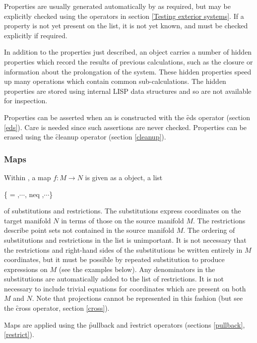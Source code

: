 Properties are usually generated automatically by  as required, but may
be explicitly checked using the operators in section \ref{Testing exterior
systems}. If a property is not yet present on the list, it is not yet
known, and must be checked explicitly if required.

In addition to the properties just described, an  object carries
a number of hidden properties which record the results of previous
calculations, such as the closure or information about the prolongation of
the system. These hidden properties speed up many operations which
contain common sub-calculations. The hidden properties are stored using
internal LISP data structures and so are not available for inspection.

Properties can be asserted when an  is constructed with the
\f{eds} operator (section \ref{eds}). Care is needed since such assertions
are never checked. Properties can be erased using the \f{cleanup} operator
(section \ref{cleanup}).

\subsubsection{Maps}
\label{Maps}

Within , a map $f:M\to N$ is given as a  object, a list
\begin{syntax}
\{ = ,$\cdots$, neq ,$\cdots$\}
\end{syntax}
of substitutions and restrictions. The substitutions express coordinates on
the target manifold $N$ in terms of those on the source manifold $M$. The
restrictions describe point sets not contained in the source manifold
$M$. The ordering of substitutions and restrictions in the list is
unimportant. It is not necessary that the restrictions and right-hand sides
of the substitutions be written entirely in $M$ coordinates, but it must be
possible by repeated substitution to produce expressions on $M$ (see the
examples below). Any denominators in the substitutions are automatically
added to the list of restrictions. It is not necessary to include trivial
equations for coordinates which are present on both $M$ and $N$. Note that
projections cannot be represented in this fashion (but see the \f{cross}
operator, section \ref{cross}).

Maps are applied using the \f{pullback} and \f{restrict} operators
(sections \ref{pullback}, \ref{restrict}).

